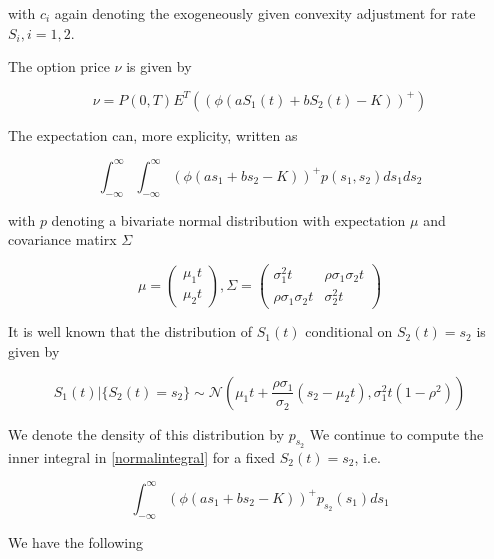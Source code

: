 \documentclass{amsart}
\theoremstyle{plain}
\numberwithin{equation}{section}
\begin{document}
with $c_i$ again denoting the exogeneously given convexity adjustment for rate $S_i, i=1,2$.

The option price $\nu$ is given by

\begin{equation}
\nu = P(0,T) E^T \left( (\phi(aS_1(t) + bS_2(t) - K))^+ \right)
\end{equation}

The expectation can, more explicity, written as

\begin{equation}\label{normalintegral}
\int_{-\infty}^{\infty} \int_{-\infty}^{\infty} (\phi(as_1+bs_2-K))^+ p(s_1,s_2) ds_1 ds_2
\end{equation}

with $p$ denoting a bivariate normal distribution with expectation $\mu$ and covariance matirx $\Sigma$

\begin{equation}
\mu = \begin{pmatrix} \mu_1t \\ \mu_2t \end{pmatrix}, 
\Sigma = \begin{pmatrix} \sigma_1^2t & \rho\sigma_1\sigma_2t \\ \rho\sigma_1\sigma_2t & \sigma_2^2t \end{pmatrix}
\end{equation}

It is well known that the distribution of $S_1(t)$ conditional on $S_2(t) = s_2$ is given by

\begin{equation}
S_1(t) | \{ S_2(t) = s_2 \} \sim \mathcal{N}\left( \mu_1t + \frac{\rho\sigma_1}{\sigma_2}(s_2-\mu_2t) , \sigma_1^2t (1-\rho^2)\right)
\end{equation}

We denote the density of this distribution by $p_{s_2}$ We continue to compute the inner integral in \ref{normalintegral} for a fixed $S_2(t) = s_2$, i.e.

\begin{equation}\label{innerintegral}
\int_{-\infty}^{\infty} (\phi(as_1+bs_2-K))^+ p_{s_2}(s_1) ds_1
\end{equation}

We have the following
\end{document}
